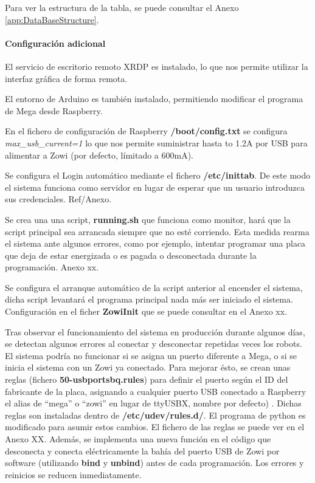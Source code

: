 Para ver la estructura de la tabla, se puede consultar el Anexo \ref{app:DataBaseStructure}.

\paragraph{Configuración adicional}
El servicio de escritorio remoto XRDP es instalado, lo que nos permite utilizar la interfaz gráfica de forma remota.

El entorno de Arduino es también instalado, permitiendo modificar el programa de Mega desde Raspberry.

En el fichero de configuración de Raspberry \textbf{/boot/config.txt} se configura \textit{max\_usb\_current=1} lo que nos permite suministrar hasta to 1.2A por USB para alimentar a Zowi (por defecto, límitado a 600mA).

Se configura el Login automático mediante el fichero \textbf{/etc/inittab}. De este modo el sistema funciona como servidor en lugar de esperar que un usuario introduzca sus credenciales. Ref/Anexo.

Se crea una una script, \textbf{running.sh} que funciona como monitor, hará que la script principal sea arrancada siempre que no esté corriendo. Esta medida rearma el sistema ante algunos errores, como por ejemplo, intentar programar una placa que deja de estar energizada o es pagada o desconectada durante la programación. Anexo xx.

Se configura el arranque automático de la script anterior al encender el sistema, dicha script levantará el programa principal nada más ser iniciado el sistema. Configuración en el ficher \textbf{ZowiInit} que se puede consultar en el Anexo xx.

Tras observar el funcionamiento del sistema en producción durante algunos días, se detectan algunos errores al conectar y desconectar repetidas veces los robots. El sistema podría no funcionar si se asigna un puerto diferente a Mega, o si se inicia el sistema con un Zowi ya conectado. Para mejorar ésto, se crean unas reglas (fichero \textbf{50-usbportsbq.rules}) para definir el puerto según el ID del fabricante de la placa, asignando a cualquier puerto USB conectado a Raspberry el alias de “mega” o “zowi” en lugar de ttyUSBX, nombre por defecto) . Dichas reglas son instaladas dentro de \textbf{/etc/udev/rules.d/}. El programa de python es modificado para asumir estos cambios. El fichero de las reglas se puede ver en el Anexo XX. Además, se implementa una nueva función en el código que desconecta y conecta eléctricamente la bahía del puerto USB de Zowi por software (utilizando \textbf{bind} y \textbf{unbind}) antes de cada programación. Los errores y reinicios se reducen inmediatamente.
